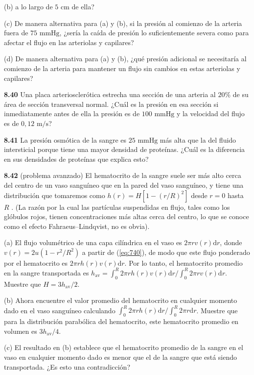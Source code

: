 \documentclass[12pt]{book}
\begin{document}
(b) a lo largo de $5\text{ cm}$ de ella?

(c) De manera alternativa para (a) y (b), si la presión al comienzo de la arteria fuera de $75\text{ mmHg}$, ¿sería la caída de presión lo suficientemente severa como para afectar el flujo en las arteriolas y capilares?

(d) De manera alternativa para (a) y (b), ¿qué presión adicional se necesitaría al comienzo de la arteria para mantener un flujo sin cambios en estas arteriolas y capilares?

\textbf{8.40} Una placa arteriosclerótica estrecha una sección de una arteria al $20\%$ de su área de sección transversal normal. ¿Cuál es la presión en esa sección si inmediatamente antes de ella la presión es de $100\text{ mmHg}$ y la velocidad del flujo es de $0{,}12\text{ m/s}$?

\textbf{8.41} La presión osmótica de la sangre es $25\text{ mmHg}$ más alta que la del fluido intersticial porque tiene una mayor densidad de proteínas. ¿Cuál es la diferencia en sus densidades de proteínas que explica esto?

\textbf{8.42} (problema avanzado) El hematocrito de la sangre suele ser más alto cerca del centro de un vaso sanguíneo que en la pared del vaso sanguíneo, y tiene una distribución que tomaremos como $h(r) = H[1 - (r/R)^2]$ desde $r = 0$ hasta $R$ \cite{51}. (La razón por la cual las partículas suspendidas en flujo, tales como los glóbulos rojos, tienen concentraciones más altas cerca del centro, lo que se conoce como el efecto Fahraeus--Lindqvist, no es obvia).

(a) El flujo volumétrico de una capa cilíndrica en el vaso es $2\pi r v(r) \mathrm{d}r$, donde $v(r) = 2u(1 - r^2/R^2)$ a partir de (\ref{eq:740}), de modo que este flujo ponderado por el hematocrito es $2\pi r h(r) v(r) \mathrm{d}r$. Por lo tanto, el hematocrito promedio en la sangre transportada es $h_{\text{av}} = \int_{0}^{R} 2\pi r h(r) v(r) \mathrm{d}r / \int_{0}^{R} 2\pi r v(r) \mathrm{d}r$. Muestre que $H = 3h_{\text{av}}/2$.

(b) Ahora encuentre el valor promedio del hematocrito en cualquier momento dado en el vaso sanguíneo calculando $\int_{0}^{R} 2\pi r h(r) \mathrm{d}r / \int_{0}^{R} 2\pi r \mathrm{d}r$. Muestre que para la distribución parabólica del hematocrito, este hematocrito promedio en volumen es $3h_{\text{av}}/4$.

(c) El resultado en (b) establece que el hematocrito promedio de la sangre en el vaso en cualquier momento dado es menor que el de la sangre que está siendo transportada. ¿Es esto una contradicción?
\end{document}
